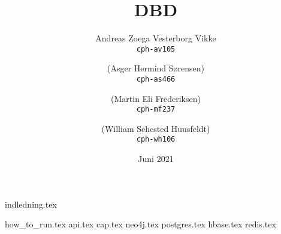 \documentclass[10pt]{article}
\title{DBD}
\author{
    Andreas Zoega Vesterborg Vikke\\
    \texttt{cph-av105}
    \and
    (Asger Hermind Sørensen)\\
    \texttt{cph-as466}
    \and
    (Martin Eli Frederiksen)\\
    \texttt{cph-mf237}
    \and
    (William Sehested Huusfeldt)\\
    \texttt{cph-wh106}
}
\date{Juni 2021}
\begin{document}
\hypersetup{pageanchor=false}

\listoftodos
{}

\maketitle
\newpage
{indledning.tex}
\tableofcontents
\newpage

{how_to_run.tex}
{api.tex}
{cap.tex}
{neo4j.tex}
{postgres.tex}
{hbase.tex}
{redis.tex}

\newpage


\end{document}
